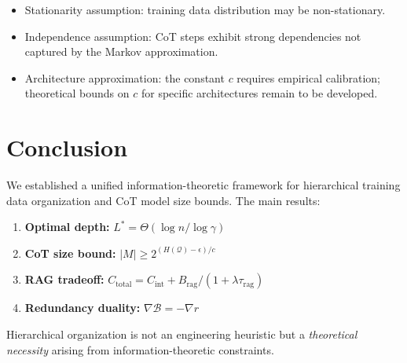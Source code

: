 \documentclass[12pt]{article}
\theoremstyle{definition}
\theoremstyle{remark}
\begin{document}
\begin{itemize}
  \item Stationarity assumption: training data distribution may be non-stationary.
  \item Independence assumption: CoT steps exhibit strong dependencies not captured by the Markov approximation.
  \item Architecture approximation: the constant $c$ requires empirical calibration; theoretical bounds on $c$ for specific architectures remain to be developed.
\end{itemize}

\section{Conclusion}

We established a unified information-theoretic framework for hierarchical training data organization and CoT model size bounds. The main results:

\begin{enumerate}
  \item \textbf{Optimal depth:} $L^* = \Theta(\log n / \log \gamma)$
  \item \textbf{CoT size bound:} $|M| \geq 2^{(H(\mathcal{Q}) - \epsilon)/c}$
  \item \textbf{RAG tradeoff:} $C_{\mathrm{total}} = C_{\mathrm{int}} + B_{\mathrm{rag}} / (1 + \lambda \tau_{\mathrm{rag}})$
  \item \textbf{Redundancy duality:} $\nabla \mathcal{B} = -\nabla r$
\end{enumerate}

Hierarchical organization is not an engineering heuristic but a \emph{theoretical necessity} arising from information-theoretic constraints.
\end{document}
